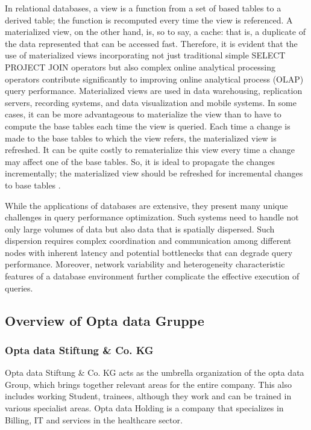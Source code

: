 In relational databases, a view is a function from a set of based tables to a derived table; the function is recomputed every time the view is referenced. A materialized view, on the other hand, is, so to say, a cache: that is, a duplicate of the data represented that can be accessed fast. Therefore, it is evident that the use of materialized views incorporating not just traditional simple SELECT PROJECT JOIN operators but also complex online analytical processing operators contribute significantly to improving online analytical process (OLAP) query performance. Materialized views are used in data warehousing, replication servers, recording systems, and data visualization and mobile systems. In some cases, it can be more advantageous to materialize the view than to have to compute the base tables each time the view is queried. Each time a change is made to the base tables to which the view refers, the materialized view is refreshed. It can be quite costly to rematerialize this view every time a change may affect one of the base tables. So, it is ideal to propagate the changes incrementally; the materialized view should be refreshed for incremental changes to base tables \cite{Data_warehousing,efficient_incremental,rashid2009role}.\vspace{.4cm}

While the applications of databases are extensive, they present many unique challenges in query performance optimization. Such systems need to handle not only large volumes of data but also data that is spatially dispersed. Such dispersion requires complex coordination and communication among different nodes with inherent latency and potential bottlenecks that can degrade query performance. Moreover, network variability and heterogeneity characteristic features of a database environment further complicate the effective execution of queries.

\subsection{Overview of Opta data Gruppe}
\subsubsection{Opta data Stiftung \& Co. KG }
Opta data Stiftung \& Co. KG acts as the umbrella organization of the opta data Group, which brings together relevant areas for the entire company. This also includes working Student, trainees, although they work and can be trained in various specialist areas. Opta data Holding is a company that specializes in Billing, IT and services in the healthcare sector.

